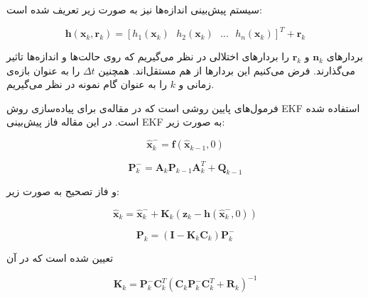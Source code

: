 \documentclass[11pt, fleqn]{article}
\begin{document}
\begin{multicols}{2}
	سیستم پیش‌بینی اندازه‌ها نیز به صورت زیر تعریف شده است:
	
\useshortskip
\begin{LTR}
\begin{equation}
\label{18}
\mathbf{h}(\mathbf{x}_k,\mathbf{r}_k) = [h_{1}(\mathbf{x}_k) \ \ \  h_{2}(\mathbf{x}_k)  \ \ \  ...  \ \ \  h_{n}(\mathbf{x}_k)]^{T} + \mathbf{r}_k
\end{equation}
\end{LTR}

بردارهای
$\mathbf{n}_k$
	 و 
$\mathbf{r}_k$
	 را بردار‌های اختلالی
در نظر می‌گیریم که روی حالت‌ها و اندازه‌ها تاثیر می‌گذارند. فرض می‌کنیم این بردارها از هم مستقل‌اند. 
همچنین 
$\Delta t$
	  را به عنوان بازه‌ی زمانی و
$k$
	را به عنوان گام نمونه در نظر می‌گیریم.
	 
فرمول‌های پایین روشی است که در مقاله‌ی
\cite{main}
 برای پیاده‌سازی روش 
EKF
استفاده شده است. در این مقاله فاز پیش‌بینی EKF به صورت زیر:

\useshortskip
\begin{LTR}
\begin{equation}
\label{19}
\hat{\mathbf{x}}^{-}_{k} = \mathbf{f}(\hat{\mathbf{x}}_{k-1},0)
\end{equation}
\end{LTR}

\useshortskip
\begin{LTR}
\begin{equation}
\label{20}
\mathbf{P}^{-}_{k} = \mathbf{A}_{k}\mathbf{P}_{k-1}\mathbf{A}^{T}_{k}+\mathbf{Q}_{k-1}
\end{equation}
\end{LTR}
و فاز تصحیح به صورت زیر:


\useshortskip
\begin{LTR}
\begin{equation}
\label{21}
\hat{\mathbf{x}}_{k} = \hat{\mathbf{x}}^{-}_{k}+\mathbf{K}_{k}(\mathbf{z}_k - \mathbf{h}(\hat{\mathbf{x}}^{-}_{k},0))
\end{equation}
\end{LTR}

\useshortskip
\begin{LTR}
\begin{equation}
\label{22}
\mathbf{P}_k = (\mathbf{I} - \mathbf{K}_{k} \mathbf{C}_{k}
)\mathbf{P}^{-}_{k}
\end{equation}
\end{LTR}

تعیین شده است که در آن


\useshortskip
\begin{LTR}
\begin{equation}
\label{23}
\mathbf{K}_k = \mathbf{P}^{-}_{k} \mathbf{C}^{T}_{k}(\mathbf{C}_{k}  \mathbf{P}^{-}_{k} \mathbf{C}^{T}_{k} + \mathbf{R}_k)^{-1}
\end{equation}
\end{LTR}


\end{multicols}
\end{document}
